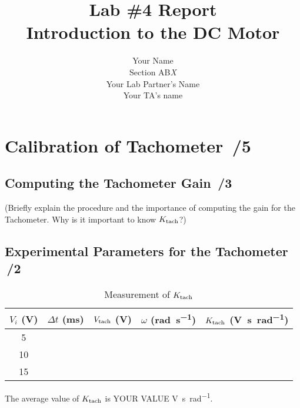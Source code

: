 \documentclass{article}
\newcommand{\score}{\hfill \underline{\hspace{0.65cm}}\,/} %
\begin{document}
\title{\bf Lab \#4 Report\\{\sc Introduction to the DC Motor}}
\author{Your Name\\ Section AB\emph{X}\\
Your Lab Partner's Name\\
Your TA's name}
\maketitle

\noindent {}

\section{Calibration of Tachometer \score 5}
\subsection{Computing the Tachometer Gain \score 3}
(Briefly explain the procedure and the importance of computing the gain for the Tachometer. Why is it important to know $K_{\rm tach}$?)

\subsection{Experimental Parameters for the Tachometer \score 2}
\begin{table}[phtb] 
\begin{center}
\caption{Measurement of $K_{\rm tach}$}
\label{tbl:lab4_q1}
\begin{tabular}{c|r|r|r|r} \hline \hline 
\cellcolor{lightgray} $V_i$ (\si{\volt}) & \cellcolor{lightgray} $\Delta t$ (\si{\milli\second}) & \cellcolor{lightgray} $V_{\rm tach}$ (\si{V}) & \cellcolor{lightgray} $\omega$ (\si{\radian\per\second}) & \cellcolor{lightgray} $K_{\rm tach}$ (\si{\volt\second\per\radian}) \\
\hline
5  &  &  &  &  \\ \hline
10 &  &  &  &  \\ \hline
15 &  &  &  &  \\ \hline
\end{tabular}
\end{center}
\end{table}

The average value of $K_{\rm tach}$ is YOUR VALUE \si{\volt\second\per\radian}.
\end{document}
